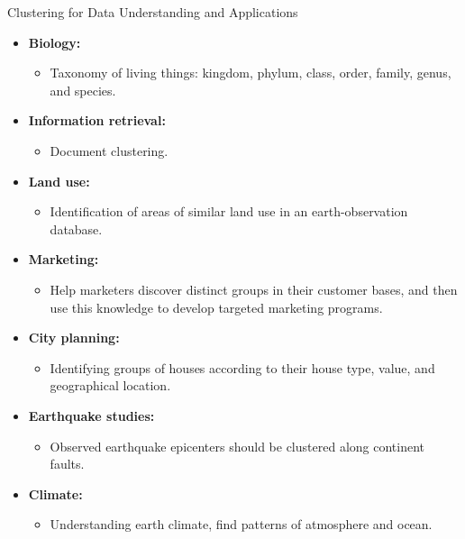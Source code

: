 \begin{frame}{Clustering for Data Understanding and Applications}
	\begin{itemize}
		\item \textbf{Biology:}
		\begin{itemize}
			\item Taxonomy of living things: kingdom, phylum, class, order, 
			family, genus, and species.
		\end{itemize}
		\item \textbf{Information retrieval:}
		\begin{itemize}
			\item Document clustering.
		\end{itemize}
		\item \textbf{Land use:}
		\begin{itemize}
			\item Identification of areas of similar land use in an 
			earth-observation database.
		\end{itemize}
		\item \textbf{Marketing:}
		\begin{itemize}
			\item Help marketers discover distinct groups in their customer 
			bases, and then use this knowledge to develop targeted marketing 
			programs.
		\end{itemize}
		\item \textbf{City planning:}
		\begin{itemize}
			\item Identifying groups of houses according to their house type, 
			value, and geographical location.
		\end{itemize}
		\item \textbf{Earthquake studies:}
		\begin{itemize}
			\item Observed earthquake epicenters should be clustered along 
			continent faults.
		\end{itemize}
		\item \textbf{Climate:}
		\begin{itemize}
			\item Understanding earth climate, find patterns of atmosphere and 
			ocean.
		\end{itemize}
	\end{itemize}
\end{frame}

